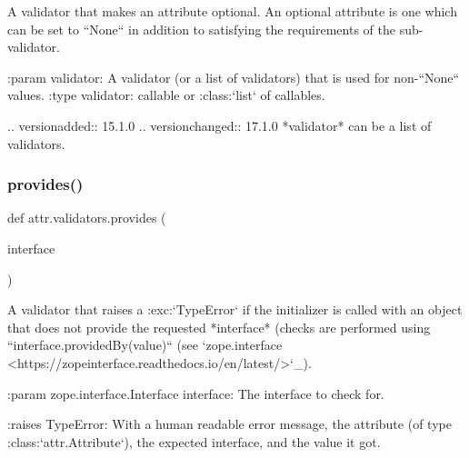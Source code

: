 \begin{DoxyVerb}A validator that makes an attribute optional.  An optional attribute is one
which can be set to ``None`` in addition to satisfying the requirements of
the sub-validator.

:param validator: A validator (or a list of validators) that is used for
    non-``None`` values.
:type validator: callable or :class:`list` of callables.

.. versionadded:: 15.1.0
.. versionchanged:: 17.1.0 *validator* can be a list of validators.
\end{DoxyVerb}
 \mbox{\label{namespaceattr_1_1validators_ab2a6c8a57857a955868028ae1c74595a}} 
\subsubsection{\texorpdfstring{provides()}{provides()}}
{\footnotesize\ttfamily def attr.\+validators.\+provides (\begin{DoxyParamCaption}\item[{}]{interface }\end{DoxyParamCaption})}

\begin{DoxyVerb}A validator that raises a :exc:`TypeError` if the initializer is called
with an object that does not provide the requested *interface* (checks are
performed using ``interface.providedBy(value)`` (see `zope.interface
<https://zopeinterface.readthedocs.io/en/latest/>`_).

:param zope.interface.Interface interface: The interface to check for.

:raises TypeError: With a human readable error message, the attribute
    (of type :class:`attr.Attribute`), the expected interface, and the
    value it got.
\end{DoxyVerb}
 